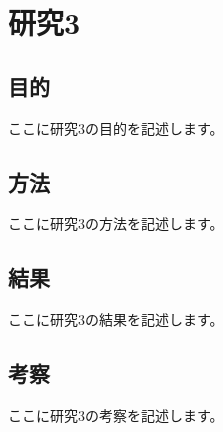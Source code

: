 \section{研究3}

\subsection{目的}
ここに研究3の目的を記述します。

\subsection{方法}
ここに研究3の方法を記述します。

\subsection{結果}
ここに研究3の結果を記述します。

\subsection{考察}
ここに研究3の考察を記述します。 
